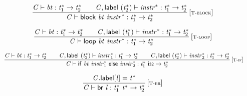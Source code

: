 \vspace{1ex}

$$
\begin{array}{@{}c@{}}\displaystyle
\frac{
{\mathit{C}} \vdash {\mathit{bt}} : {{\mathit{t}}_{{1}}^\ast} \rightarrow {{\mathit{t}}_{{2}}^\ast}
 \qquad
{\mathit{C}}, \mathsf{label}~({{\mathit{t}}_{{2}}^\ast}) \vdash {{\mathit{instr}}^\ast} : {{\mathit{t}}_{{1}}^\ast} \rightarrow {{\mathit{t}}_{{2}}^\ast}
}{
{\mathit{C}} \vdash \mathsf{block}~{\mathit{bt}}~{{\mathit{instr}}^\ast} : {{\mathit{t}}_{{1}}^\ast} \rightarrow {{\mathit{t}}_{{2}}^\ast}
} \, {[\textsc{\scriptsize T{-}block}]}
\qquad
\end{array}
$$

$$
\begin{array}{@{}c@{}}\displaystyle
\frac{
{\mathit{C}} \vdash {\mathit{bt}} : {{\mathit{t}}_{{1}}^\ast} \rightarrow {{\mathit{t}}_{{2}}^\ast}
 \qquad
{\mathit{C}}, \mathsf{label}~({{\mathit{t}}_{{1}}^\ast}) \vdash {{\mathit{instr}}^\ast} : {{\mathit{t}}_{{1}}^\ast} \rightarrow {{\mathit{t}}_{{2}}^\ast}
}{
{\mathit{C}} \vdash \mathsf{loop}~{\mathit{bt}}~{{\mathit{instr}}^\ast} : {{\mathit{t}}_{{1}}^\ast} \rightarrow {{\mathit{t}}_{{2}}^\ast}
} \, {[\textsc{\scriptsize T{-}loop}]}
\qquad
\end{array}
$$

$$
\begin{array}{@{}c@{}}\displaystyle
\frac{
{\mathit{C}} \vdash {\mathit{bt}} : {{\mathit{t}}_{{1}}^\ast} \rightarrow {{\mathit{t}}_{{2}}^\ast}
 \qquad
{\mathit{C}}, \mathsf{label}~({{\mathit{t}}_{{2}}^\ast}) \vdash {{\mathit{instr}}_{{1}}^\ast} : {{\mathit{t}}_{{1}}^\ast} \rightarrow {{\mathit{t}}_{{2}}^\ast}
 \qquad
{\mathit{C}}, \mathsf{label}~({{\mathit{t}}_{{2}}^\ast}) \vdash {{\mathit{instr}}_{{2}}^\ast} : {{\mathit{t}}_{{1}}^\ast} \rightarrow {{\mathit{t}}_{{2}}^\ast}
}{
{\mathit{C}} \vdash \mathsf{if}~{\mathit{bt}}~{{\mathit{instr}}_{{1}}^\ast}~\mathsf{else}~{{\mathit{instr}}_{{2}}^\ast} : {{\mathit{t}}_{{1}}^\ast}~\mathsf{i{\scriptstyle32}} \rightarrow {{\mathit{t}}_{{2}}^\ast}
} \, {[\textsc{\scriptsize T{-}if}]}
\qquad
\end{array}
$$

\vspace{1ex}

$$
\begin{array}{@{}c@{}}\displaystyle
\frac{
{\mathit{C}}.\mathsf{label}{}[{\mathit{l}}] = {{\mathit{t}}^\ast}
}{
{\mathit{C}} \vdash \mathsf{br}~{\mathit{l}} : {{\mathit{t}}_{{1}}^\ast}~{{\mathit{t}}^\ast} \rightarrow {{\mathit{t}}_{{2}}^\ast}
} \, {[\textsc{\scriptsize T{-}br}]}
\qquad
\end{array}
$$

